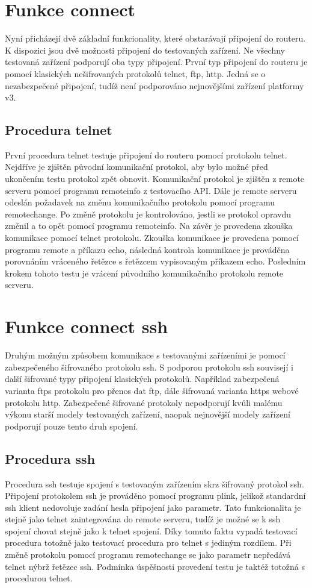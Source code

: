 \section{Funkce connect}
Nyní přicházejí dvě základní funkcionality, které obstarávají připojení do routeru. K dispozici jsou dvě možnosti připojení do testovaných zařízení. Ne všechny testovaná zařízení podporují oba typy připojení. První typ připojení do routeru je pomocí klasických nešifrovaných protokolů telnet, ftp, http. Jedná se o nezabezpečené připojení, tudíž není podporováno nejnovějšími zařízení platformy v3.

\subsection{Procedura telnet}
První procedura telnet testuje připojení do routeru pomocí protokolu telnet. Nejdříve je zjištěn původní komunikační protokol, aby bylo možné před ukončením testu protokol zpět obnovit. Komunikační protokol je zjištěn z remote serveru pomocí programu remoteinfo z testovacího API. Dále je remote serveru odeslán požadavek na změnu komunikačního protokolu pomocí programu remotechange. Po změně protokolu je kontrolováno, jestli se protokol opravdu změnil a to opět pomocí programu remoteinfo. Na závěr je provedena zkouška komunikace pomocí telnet protokolu. Zkouška komunikace je provedena pomocí programu remote a příkazu echo, následná kontrola komunikace je prováděna porovnáním vráceného řetězce s řetězcem vypisovaným příkazem echo. Posledním krokem tohoto testu je vrácení původního komunikačního protokolu remote serveru.

\section{Funkce connect ssh}
Druhým možným způsobem komunikace s testovanými zařízeními je pomocí zabezpečeného šifrovaného protokolu ssh. S podporou protokolu ssh souvisejí i další šifrované typy připojení klasických protokolů. Například zabezpečená varianta ftps protokolu pro přenos dat ftp, dále šifrovaná varianta https webové protokolu http. Zabezpečené šifrované protokoly nepodporují kvůli malému výkonu starší modely testovaných zařízení, naopak nejnovější modely zařízení podporují pouze tento druh spojení.

\subsection{Procedura ssh}
Procedura ssh testuje spojení s testovaným zařízením skrz šifrovaný protokol ssh. Připojení protokolem ssh je prováděno pomocí programu plink, jelikož standardní ssh klient nedovoluje zadání hesla připojení jako parametr. Tato funkcionalita je stejně jako telnet zaintegrována do remote serveru, tudíž je možné se k ssh spojení chovat stejně jako k telnet spojení. Díky tomuto faktu vypadá testovací procedura totožně jako testovací procedura pro telnet s jediným rozdílem. Při změně protokolu pomocí programu remotechange se jako parametr nepředává telnet nýbrž řetězec ssh. Podmínka úspěšnosti provedení testu je taktéž totožná s procedurou telnet.

